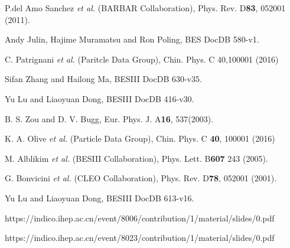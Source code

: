 \newpage
\begin{thebibliography}{99}

P.del Amo Sanchez {\it et al.}  (BARBAR Collaboration),
Phys. Rev. D\textbf{83}, 052001 (2011).

Andy Julin, Hajime Muramatsu and Ron Poling,  
BES\uppercase\expandafter{} DocDB 580-v1.

C. Patrignani {\it et al.}  (Paritcle Data Group),
Chin. Phys. C 40,100001 (2016)

Sifan Zhang and Hailong Ma, 
BESIII DocDB 630-v35.

Yu Lu and Liaoyuan Dong, 
BESIII DocDB 416-v30.

B. S. Zou and D. V. Bugg, 
Eur. Phys. J. A\textbf{16}, 537(2003).

K. A. Olive {\it et al.} (Particle Data Group), 
Chin. Phys. C \textbf{40}, 100001 (2016)

M. Alblikim {\it et al.}  (BESIII Collaboration),
Phys. Lett. B\textbf{607} 243 (2005).

G. Bonvicini {\it et al.}  (CLEO Collaboration),
Phys. Rev. D\textbf{78}, 052001 (2001).

Yu Lu and Liaoyuan Dong, 
BESIII DocDB 613-v16.

https://indico.ihep.ac.cn/event/8006/contribution/1/material/slides/0.pdf

https://indico.ihep.ac.cn/event/8023/contribution/1/material/slides/0.pdf

\end{thebibliography}

